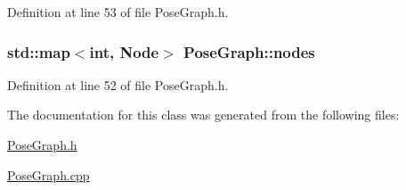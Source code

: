 \-Definition at line 53 of file \-Pose\-Graph.\-h.

\hypertarget{classPoseGraph_aeebc9858b540e6f182c4fb0d491fc073}{
\subsubsection[{nodes}]{\setlength{\rightskip}{0pt plus 5cm}std\-::map$<$int, {\bf \-Node}$>$ {\bf \-Pose\-Graph\-::nodes}}}\label{classPoseGraph_aeebc9858b540e6f182c4fb0d491fc073}


\-Definition at line 52 of file \-Pose\-Graph.\-h.



\-The documentation for this class was generated from the following files\-:\begin{DoxyCompactItemize}
\item 
\hyperlink{PoseGraph_8h}{\-Pose\-Graph.\-h}\item 
\hyperlink{PoseGraph_8cpp}{\-Pose\-Graph.\-cpp}\end{DoxyCompactItemize}
